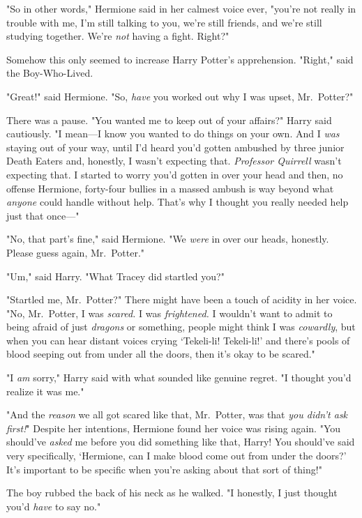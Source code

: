 "So in other words," Hermione said in her calmest voice ever, "you're not
really in trouble with me, I'm still talking to you, we're still friends, and
we're still studying together. We're \emph{not} having a fight. Right?"

Somehow this only seemed to increase Harry Potter's apprehension. "Right," said
the Boy-Who-Lived.

"Great!" said Hermione. "So, \emph{have} you worked out why I was upset,
Mr.~Potter?"

There was a pause. "You wanted me to keep out of your affairs?" Harry said
cautiously. "I mean---I know you wanted to do things on your own. And I
\emph{was} staying out of your way, until I'd heard you'd gotten ambushed by
three junior Death Eaters and, honestly, I wasn't expecting that.
\emph{Professor Quirrell} wasn't expecting that. I started to worry you'd
gotten in over your head and then, no offense Hermione, forty-four bullies in a
massed ambush is way beyond what \emph{anyone} could handle without help.
That's why I thought you really needed help just that once\mbox{---}"

"No, that part's fine," said Hermione. "We \emph{were} in over our heads,
honestly. Please guess again, Mr.~Potter."

"Um," said Harry. "What Tracey did{\el} startled you?"

"Startled me, Mr.~Potter?" There might have been a touch of acidity in her
voice. "No, Mr.~Potter, I was \emph{scared.} I was \emph{frightened.} I
wouldn't want to admit to being afraid of just \emph{dragons} or something,
people might think I was \emph{cowardly}, but when you can hear distant voices
crying `Tekeli-li! Tekeli-li!' and there's pools of blood seeping out from
under all the doors, then it's okay to be scared."

"I \emph{am} sorry," Harry said with what sounded like genuine regret. "I
thought you'd realize it was me."

"And the \emph{reason} we all got scared like that, Mr.~Potter, was that
\emph{you didn't ask first!}" Despite her intentions, Hermione found her voice
was rising again. "You should've \emph{asked} me before you did something like
that, Harry! You should've said very specifically, `Hermione, can I make blood
come out from under the doors?' It's important to be specific when you're
asking about that sort of thing!"

The boy rubbed the back of his neck as he walked. "I{\el} honestly, I just
thought you'd \emph{have} to say no."

